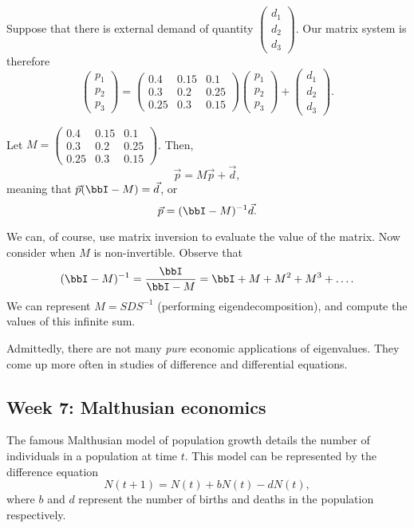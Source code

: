 \documentclass[a4paper, 12pt,oneside,openany]{book}
\begin{document}
Suppose that there is external demand of quantity $\begin{pmatrix} d_1 \\ d_2 \\ d_3 \end{pmatrix}$. Our matrix system is therefore $$\begin{pmatrix} p_1 \\ p_2 \\ p_3 \end{pmatrix}= \begin{pmatrix} 0.4&0.15&0.1 \\ 0.3&0.2&0.25 \\ 0.25&0.3&0.15 \end{pmatrix} \begin{pmatrix} p_1 \\ p_2 \\ p_3 \end{pmatrix}+\begin{pmatrix} d_1 \\ d_2 \\ d_3 \end{pmatrix}.$$

Let $M=\begin{pmatrix} 0.4&0.15&0.1 \\ 0.3&0.2&0.25 \\ 0.25&0.3&0.15 \end{pmatrix}$. Then, $$\vec{p} =M\vec{p}+\vec{d},$$ meaning that $\vec{p}(\bbI-M)=\vec{d}$, or $$\vec{p} = (\bbI-M)^{-1} \vec{d}.$$

We can, of course, use matrix inversion to evaluate the value of the matrix. Now consider when $M$ is non-invertible. Observe that $$(\bbI-M)^{-1} = \frac{\bbI}{\bbI-M} = \bbI+M + M^2+M^3+\dots.$$We can represent $M = SDS^{-1}$ (performing eigendecomposition), and compute the values of this infinite sum.

Admittedly, there are not many \emph{pure} economic applications of eigenvalues. They come up more often in studies of difference and differential equations.

\subsection{Week 7: Malthusian economics}

The famous Malthusian model of population growth details the number of individuals in a population at time $t$. This model can be represented by the difference equation $$N(t+1)= N(t) + b N(t) - d N(t),$$ where $b$ and $d$ represent the number of births and deaths in the population respectively. 
\end{document}
